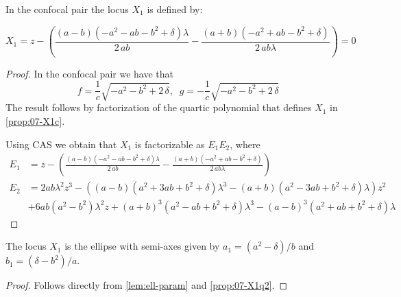 \begin{proposition} In the confocal pair the locus $X_1$ is defined by:


 \[   X_1 =z-\left({\frac { \left( a-b \right)  \left( -{a}^{2}-a b-{b}^{2}+\delta
 \right) \lambda}{2\,a b}}-{\frac { \left( a+b \right)  \left( -{a}^{2}
+a b-{b}^{2}+\delta \right) }{2\,a b\lambda}}\right)=0\]
\label{prop:07-X1q2} 
\end{proposition}

\begin{proof} In the confocal pair 
we have that
\[f={\frac {1}{c}\sqrt {-{a}^{2}-{b}^{2}+2\,\delta}}, \;\; g= -{\frac {1}{c}\sqrt {-{a}^{2}-{b}^{2}+2\,\delta}}\]
The result follows by factorization of the quartic  polynomial that defines $X_1$ in \cref{prop:07-X1c}.

Using CAS we obtain that $X_1$ is factorizable as $E_1 E_2$, where
\begin{align*}
    E_1&=z-\left({\frac { \left( a-b \right)  \left( -{a}^{2}-a b-{b}^{2}+\delta
 \right) \lambda}{2\,a b}}-{\frac { \left( a+b \right)  \left( -{a}^{2}
+a b-{b}^{2}+\delta \right) }{2\,a b\lambda}}\right)
\\
    E_2&=2 a b \lambda^2 z^3 - ((a - b) (a^2 + 3 a b + b^2 + \delta) \lambda^3 - (a + b) (a^2 - 3 a b + b^2 + \delta) \lambda) z^2\\
    &+ 6 a b  (a^2 - b^2) \lambda^2 z + (a + b)^3 (a^2 - a b + b^2 + \delta) \lambda^3 - (a - b)^3 (a^2 + a b + b^2 + \delta) \lambda
\end{align*}
\end{proof}

\begin{corollary}
The locus $X_1$ is the ellipse with semi-axes given by $a_1=(a^2-\delta)/b$ and $b_1=(\delta-b^2)/a.$

 
\end{corollary}

\begin{proof}
Follows directly from  \cref{lem:ell-param} and  \cref{prop:07-X1q2}.
\end{proof}

